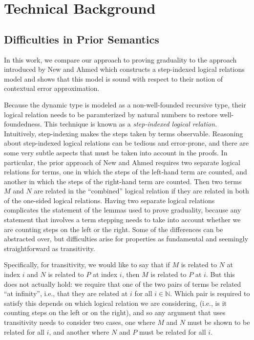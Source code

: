 \section{Technical Background}\label{sec:technical-background}



\subsection{Difficulties in Prior Semantics}

  In this work, we compare our approach to proving graduality to the approach
  introduced by New and Ahmed \cite{new-ahmed2018} which constructs a step-indexed
  logical relations model and shows that this model is sound with respect to their
  notion of contextual error approximation.

  Because the dynamic type is modeled as a non-well-founded
  recursive type, their logical relation needs to be paramterized by natural numbers
  to restore well-foundedness. This technique is known as a \emph{step-indexed logical relation}.
  Intuitively, step-indexing makes the steps taken by terms observable.
  Reasoning about step-indexed logical relations
  can be tedious and error-prone, and there are some very subtle aspects that must
  be taken into account in the proofs.
  In particular, the prior approach of New and Ahmed requires two separate logical
  relations for terms, one in which the steps of the left-hand term are counted,
  and another in which the steps of the right-hand term are counted.
  Then two terms $M$ and $N$ are related in the ``combined'' logical relation if they are
  related in both of the one-sided logical relations. Having two separate logical relations
  complicates the statement of the lemmas used to prove graduality, because any statement that
  involves a term stepping needs to take into account whether we are counting steps on the left
  or the right. Some of the differences can be abstracted over, but difficulties arise for properties %
  as fundamental and seemingly straightforward as transitivity.

  Specifically, for transitivity, we would like to say that if $M$ is related to $N$ at
  index $i$ and $N$ is related to $P$ at index $i$, then $M$ is related to $P$ at $i$.
  But this does not actually hold: we require that one of the two pairs of terms
  be related ``at infinity'', i.e., that they are related at $i$ for all $i \in \mathbb{N}$.
  Which pair is required to satisfy this depends on which logical relation we are considering,
  (i.e., is it counting steps on the left or on the right),
  and so any argument that uses transitivity needs to consider two cases, one
  where $M$ and $N$ must be shown to be related for all $i$, and another where $N$ and $P$ must
  be related for all $i$. %

